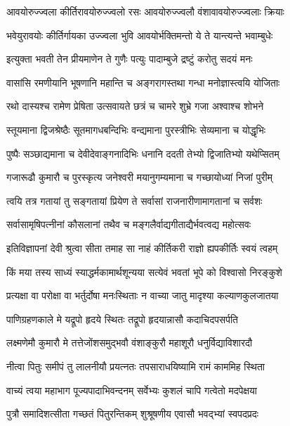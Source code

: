 \twolineshloka
{आवयोरुज्ज्वला कीर्तिरावयोरुज्ज्वलो रसः}
{आवयोरुज्ज्वलौ वंशावावयोरुज्ज्वलाः क्रियाः}%

\twolineshloka
{भवेयुरावयोः कीर्तिर्गायका उज्ज्वला भुवि}
{आवयोर्भक्तिमन्तो ये ते यान्त्यन्ते भवाम्बुधेः}%

\twolineshloka
{इत्युक्ता भवती तेन प्रीयमाणेन ते गुणैः}
{पत्युः पादाम्बुजे द्रष्टुं करोतु सदयं मनः}%

\twolineshloka
{वासांसि रमणीयानि भूषणानि महान्ति च}
{अङ्गरागस्तथा गन्धा मनोज्ञास्त्वयि योजिताः}%

\twolineshloka
{रथो दास्यश्च रामेण प्रेषिता उत्सवायते}
{छत्रं च चामरे शुभ्रे गजा अश्वाश्च शोभने}%

\twolineshloka
{स्तूयमाना द्विजश्रेष्ठैः सूतमागधबन्दिभिः}
{वन्द्यमाना पुरस्त्रीभिः सेव्यमाना च योद्धृभिः}%

\twolineshloka
{पुष्पैः सञ्छाद्यमाना च देवीदेवाङ्गनादिभिः}
{धनानि ददती तेभ्यो द्विजातिभ्यो यथेप्सितम्}%

\twolineshloka
{गजारूढौ कुमारौ च पुरस्कृत्य जनेश्वरी}
{मयानुगम्यमाना च गच्छायोध्यां निजां पुरीम्}%

\twolineshloka
{त्वयि तत्र गतायां तु सङ्गतायां प्रियेण ते}
{सर्वासां राजनारीणामागतानां च सर्वशः}%

\twolineshloka
{सर्वासामृषिपत्नीनां कौसलानां तथैव च}
{मङ्गलैर्वाद्यगीताद्यैर्भवत्वद्य महोत्सवः}%


\twolineshloka
{इतिविज्ञापनां देवी श्रुत्वा सीता तमाह सा}
{नाहं कीर्तिकरी राज्ञो ह्यपकीर्तिः स्वयं त्वहम्}%

\twolineshloka
{किं मया तस्य साध्यं स्याद्धर्मकामार्थशून्यया}
{सत्येवं भवतां भूपे को विश्वासो निरङ्कुशे}%

\twolineshloka
{प्रत्यक्षा वा परोक्षा वा भर्तुर्दोषा मनःस्थिताः}
{न वाच्या जातु मादृश्या कल्याणकुलजातया}%

\twolineshloka
{पाणिग्रहणकाले मे यद्रूपो हृदये स्थितः}
{तद्रूपो हृदयान्नासौ कदाचिदपसर्पति}%

\twolineshloka
{लक्ष्मणेमौ कुमारौ मे तत्तेजोंशसमुद्भवौ}
{वंशाङ्कुरौ महाशूरौ धनुर्विद्याविशारदौ}%

\twolineshloka
{नीत्वा पितुः समीपं तु लालनीयौ प्रयत्नतः}
{तपसाराधयिष्यामि रामं काममिह स्थिता}%

\twolineshloka
{वाच्यं त्वया महाभाग पूज्यपादाभिवन्दनम्}
{सर्वेभ्यः कुशलं चापि गत्वेतो मदपेक्षया}%

\twolineshloka
{पुत्रौ समादिशत्सीता गच्छतं पितुरन्तिकम्}
{शुश्रूषणीय एवासौ भवद्भ्यां स्वपदप्रदः}%

